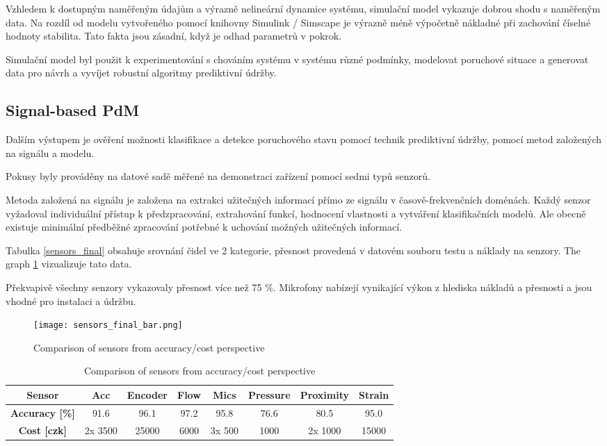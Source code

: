 Vzhledem k dostupným naměřeným údajům a výrazně nelineární dynamice
systému, simulační model vykazuje dobrou shodu s naměřeným
data. Na rozdíl od modelu vytvořeného pomocí knihovny Simulink / Simscape je
výrazně méně výpočetně nákladné při zachování číselné hodnoty
stabilita. Tato fakta jsou zásadní, když je odhad parametrů v
pokrok.

Simulační model byl použit k experimentování s chováním systému v systému
různé podmínky, modelovat poruchové situace a generovat data pro návrh
a vyvíjet robustní algoritmy prediktivní údržby.


\subsection{Signal-based PdM}
Dalším výstupem je ověření možnosti klasifikace a
detekce poruchového stavu pomocí technik prediktivní údržby,
pomocí metod založených na signálu a modelu.
 
Pokusy byly prováděny na datové sadě měřené na demonstraci
zařízení pomocí sedmi typů senzorů.
  
Metoda založená na signálu je založena na extrakci užitečných informací
přímo ze signálu v časově-frekvenčních doménách. Každý senzor vyžadoval
individuální přístup k předzpracování, extrahování funkcí, hodnocení
vlastnosti a vytváření klasifikačních modelů. Ale obecně existuje
minimální předběžné zpracování potřebné k uchování možných užitečných informací.

Tabulka \ref{sensors_final} obsahuje srovnání čidel ve 2
kategorie, přesnost provedená v datovém souboru testu a náklady na senzory. The
graph \ref{fig:sensors_final_bar} vizualizuje tato data.

Překvapivě všechny senzory vykazovaly přesnost více než 75 \%. Mikrofony
nabízejí vynikající výkon z hlediska nákladů a přesnosti a jsou
vhodné pro instalaci a údržbu.

\begin{figure}[h!]
    \centering
    \texttt{[image: sensors\_final\_bar.png]}
    \caption{Comparison of sensors from accuracy/cost perspective}
    \label{fig:sensors_final_bar}
\end{figure}

\begin{table}[h]
    \centering
    \begin{tabular}{|c|c|c|c|c|c|c|c|}
        \hline
        \textbf{Sensor}   & Acc & Encoder & Flow & Mics & Pressure & Proximity & Strain \\
        \hline
        \textbf{Accuracy [\%]} & 91.6 & 96.1 & 97.2 & 95.8 & 76.6 & 80.5 & 95.0 \\
        \hline
        \textbf{Cost [czk]} & 2x 3500 & 25000 & 6000 & 3x 500 & 1000 & 2x 1000 & 15000 \\
        \hline
    \end{tabular}
    \caption{Comparison of sensors from accuracy/cost perspective}
    \label{tab:sensors_final}
\end{table}

